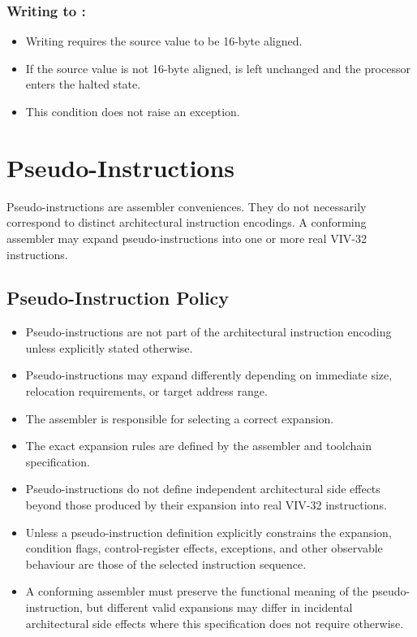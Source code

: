\subsubsection{Writing to :}
\begin{itemize}
\item Writing  requires the source value to be 16-byte aligned.
\item If the source value is not 16-byte aligned,  is left unchanged and
the processor enters the halted state.
\item This condition does not raise an exception.
\end{itemize}


\section{Pseudo-Instructions}

Pseudo-instructions are assembler conveniences. They do not necessarily correspond
to distinct architectural instruction encodings. A conforming assembler may expand
pseudo-instructions into one or more real VIV-32 instructions.

\subsection{Pseudo-Instruction Policy}

\begin{itemize}
  \item Pseudo-instructions are not part of the architectural instruction encoding
        unless explicitly stated otherwise.
  \item Pseudo-instructions may expand differently depending on immediate size,
        relocation requirements, or target address range.
  \item The assembler is responsible for selecting a correct expansion.
  \item The exact expansion rules are defined by the assembler and toolchain specification.
  \item Pseudo-instructions do not define independent architectural side effects beyond
        those produced by their expansion into real VIV-32 instructions.
  \item Unless a pseudo-instruction definition explicitly constrains the expansion,
        condition flags, control-register effects, exceptions, and other observable
        behaviour are those of the selected instruction sequence.
  \item A conforming assembler must preserve the functional meaning of the
        pseudo-instruction, but different valid expansions may differ in incidental
        architectural side effects where this specification does not require otherwise.
\end{itemize}

